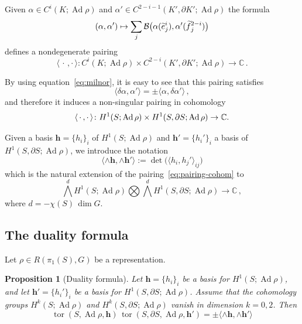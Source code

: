 \documentclass[11pt]{article}
\newtheorem{prop}[theo]{Proposition}
\theoremstyle{definition}
\numberwithin{equation}{section}
\numberwithin{figure}{section}
\numberwithin{table}{section}
\DeclareMathOperator{\tor}{tor}
\DeclareMathOperator{\Ad}{Ad}
\newcommand{\Bcal}{\mathcal{B}}
\newcommand{\Cbb}{\mathbb{C}}
\newcommand{\hbf}{\mathbf{h}}
\let\oldtilde\tilde
\renewcommand*{\tilde}[1]{\mathchoice{\widetilde{#1}}{\widetilde{#1}}{\oldtilde{#1}}{\oldtilde{#1}}}\let\oldhat\hat
\renewcommand*{\hat}[1]{\mathchoice{\widehat{#1}}{\widehat{#1}}{\oldhat{#1}}{\oldhat{#1}}}\let\oldforall\forall
\renewcommand*{\forall}{\mathrel{\oldforall}}
\begin{document}
Given $\alpha\in C^i(K;\Ad\rho) $ and $\alpha'\in C^{2-i-1}(K',\partial K';\Ad\rho) $ the formula
\[
(\alpha,\alpha') \mapsto \sum_{j}
\Bcal\big(\alpha(\tilde{e}^i_j), \alpha'(\tilde{f}^{2-i}_j) \big)
\]
defines a nondegenerate pairing
\begin{equation}\label{eqn:intersectionchains}
\langle\,\cdot\,,\cdot\,\rangle\colon C^i(K;\Ad\rho)\times C^{2-i}(K',\partial K';\Ad\rho) \to \Cbb\,.
\end{equation}

By using equation~\eqref{eq:milnor}, it is easy to see that this pairing satisfies
\begin{equation}\label{eqn:intersectionboundary}
\langle \delta \alpha, \alpha'\rangle = \pm \langle \alpha, \delta \alpha'\rangle\,,
\end{equation}
and therefore it induces a non-singular pairing in cohomology
\begin{equation}\label{eq:pairing-cohom}
\langle\,\cdot\,,\cdot\,\rangle\colon H^1(S;\Ad\rho)\times H^{1}(S,\partial S;\Ad\rho) \to \Cbb.\\
\end{equation}

Given a basis ${\hbf}=\{ h_i\}_i $ of $ H^1(S;\Ad\rho) $ and ${\hbf}'=\{ h_i'\}_i $ a basis of $ H^1(S,\partial S;\Ad\rho) $, we introduce the notation
\begin{equation}
\langle \wedge{\hbf}, \wedge{\hbf} '\rangle := \det\big(\langle h_i, h_j' \rangle_{ij} \big)
\end{equation}
which is the natural extension of the pairing~\eqref{eq:pairing-cohom} to
\[
\bigwedge^d H^1(S;\Ad\rho) \bigotimes
\bigwedge^d H^1(S,\partial S;\Ad\rho) \to\Cbb\,,
\]
where $d=-\chi(S)\,\dim G$.

\subsection{The duality formula}
Let $\rho\in R(\pi_1(S),G)$ be a representation.
\begin{prop}[Duality formula]\label{Proposition:duality}
Let ${\hbf}=\{ h_i\}_i $ be a basis for $ H^1(S;\Ad\rho) $, and let ${\hbf}'=\{ h_i'\}_i $ be a basis for $ H^1(S,\partial S;\Ad\rho) $. Assume that the cohomology groups $H^k(S;\Ad\rho)$ and $H^k(S,\partial S;\Ad\rho)$ vanish in dimension $k=0, 2$. Then
\[
\tor(S,\Ad\rho, {\hbf}) \,
\tor(S,\partial S,\Ad\rho, {\hbf}') =
\pm \langle \wedge {\hbf}, \wedge {\hbf} ' \rangle
\]
\end{prop}
\end{document}
